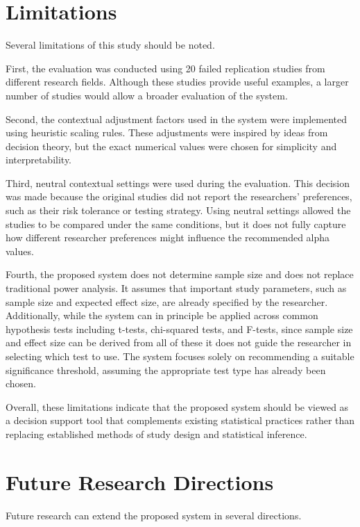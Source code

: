 \section{Limitations}
Several limitations of this study should be noted.

First, the evaluation was conducted using 20 failed replication studies from different research fields. Although these studies provide useful examples, a larger number of studies would allow a broader evaluation of the system.

Second, the contextual adjustment factors used in the system were implemented using heuristic scaling rules. These adjustments were inspired by ideas from decision theory\cite{Berger1985}, but the exact numerical values were chosen for simplicity and interpretability.

Third, neutral contextual settings were used during the evaluation. This decision was made because the original studies did not report the researchers’ preferences, such as their risk tolerance or testing strategy. Using neutral settings allowed the studies to be compared under the same conditions, but it does not fully capture how different researcher preferences might influence the recommended alpha values.

Fourth, the proposed system does not determine sample size and does not replace traditional power analysis. It assumes that important study parameters, such as sample size and expected effect size, are already specified by the researcher. Additionally, while the system can in principle be applied across common hypothesis tests including t-tests, chi-squared tests, and F-tests, since sample size and effect size can be derived from all of these it does not guide the researcher in selecting which test to use. The system focuses solely on recommending a suitable significance threshold, assuming the appropriate test type has already been chosen.

Overall, these limitations indicate that the proposed system should be viewed as a decision support tool that complements existing statistical practices rather than replacing established methods of study design and statistical inference.

\section{Future Research Directions}

Future research can extend the proposed system in several directions.

